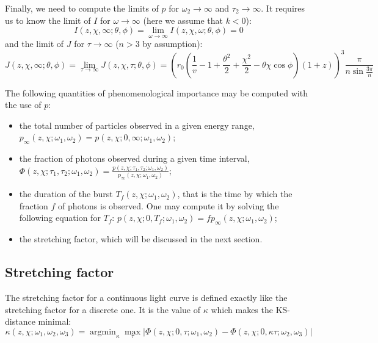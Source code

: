 \documentclass{article}
\DeclareMathOperator*{\argmin}{argmin}
\begin{document}
Finally, we need to compute the limits of $p$ for $\omega_2
\rightarrow \infty$ and $\tau_2 \rightarrow \infty$. It requires us to
know the limit of $I$ for $\omega \rightarrow \infty$ (here we assume that
$k < 0$):
\begin{equation}
I\left(z,\chi,\infty;\theta,\phi\right) = \lim_{\omega \rightarrow \infty} I\left(z,\chi,\omega;\theta,\phi\right) = 0
\end{equation}
and the limit of $J$ for $\tau \rightarrow \infty$ ($n > 3$ by assumption):
\begin{equation}
J\left(z,\chi,\infty;\theta,\phi\right) = \lim_{\tau \rightarrow \infty} J\left(z,\chi,\tau;\theta,\phi\right) = \left(r_0 \left( \frac{1}{v} -  1 + \frac{\theta^2}{2} + \frac{\chi^2}{2} - \theta\chi\cos\phi \right) \left(1+z\right)\right)^3 \frac{\pi}{n\sin\frac{3\pi}{n}}
\end{equation}

The following quantities of phenomenological importance may be
computed with the use of $p$:
\begin{itemize}
\item{the total number of particles observed in a given energy range,
  $p_\infty\left(z,\chi; \omega_1,\omega_2\right) = p\left( z,\chi;
  0,\infty; \omega_1,\omega_2 \right)$;}
\item{the fraction of photons observed during a given time interval,
  $\Phi\left(z,\chi; \tau_1,\tau_2; \omega_1,\omega_2\right) =
  \frac{p\left( z,\chi; \tau_1,\tau_2;
    \omega_1,\omega_2\right)}{p_\infty\left( z,\chi; \omega_1,\omega_2
    \right)}$;}
\item{the duration of the burst $T_f\left( z,\chi;\omega_1,\omega_2
  \right)$, that is the time by which the fraction $f$ of photons is
  observed. One may compute it by solving the following equation for
  $T_f$: $p\left( z,\chi; 0,T_f; \omega_1,\omega_2\right) = f
  p_\infty\left( z,\chi; \omega_1,\omega_2 \right)$;}
\item{the stretching factor, which will be discussed in the next
  section.}
\end{itemize}

\subsection{Stretching factor}
The stretching factor for a continuous light curve is defined exactly
like the stretching factor for a discrete one. It is the value of
$\kappa$ which makes the KS-distance minimal:
\begin{equation}
\kappa\left(z,\chi; \omega_1, \omega_2, \omega_3\right) = \argmin_\kappa \max_\tau\left| \Phi\left(z,\chi; 0,\tau; \omega_1,\omega_2\right) - \Phi\left( z,\chi; 0,\kappa \tau; \omega_2,\omega_3 \right) \right|
\end{equation}
\end{document}
